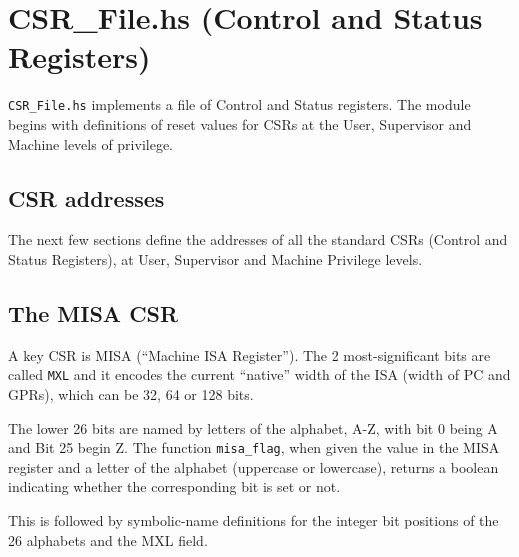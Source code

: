 \documentclass[11pt]{article}
\begin{document}

\section{CSR\_File.hs (Control and Status Registers)}

\label{sec_csrs}

\verb|CSR_File.hs| implements a file of Control and Status registers.
The module begins with definitions of reset values for CSRs at the
User, Supervisor and Machine levels of privilege.


\subsection{CSR addresses}

The next few sections define the addresses of all the standard CSRs
(Control and Status Registers), at User, Supervisor and Machine
Privilege levels.




\subsection{The MISA CSR}

A key CSR is MISA (``Machine ISA Register'').  The 2 most-significant
bits are called \verb|MXL| and it encodes the current ``native'' width
of the ISA (width of PC and GPRs), which can be 32, 64 or 128 bits.



The lower 26 bits are named by letters of the alphabet, A-Z, with bit
0 being A and Bit 25 begin Z.  The function \verb|misa_flag|, when
given the value in the MISA register and a letter of the alphabet
(uppercase or lowercase), returns a boolean indicating whether the
corresponding bit is set or not.



This is followed by symbolic-name definitions for the integer bit
positions of the 26 alphabets and the MXL field.



\end{document}
